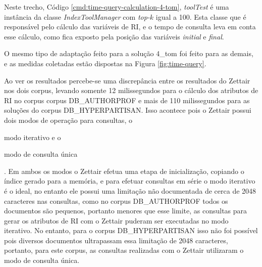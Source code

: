 			\begin{listing}[H]
			\end{listing}
			\vspace{-1.0cm}
			\inputminted[bgcolor=bg, 
			tabsize=4, baselinestretch=1, breaklines]{python}{codes/time-query-calculation-4-tom.py}
			\vspace{-1.0cm}
			\Ididthis

			Neste trecho, Código \ref{cmd:time-query-calculation-4-tom}, \textit{toolTest} é uma instância da classe \textit{IndexToolManager} com \textit{top-$k$} igual a 100. 
			Esta classe que é responsável pelo cálculo das variáveis de RI, e o tempo de consulta leva em conta esse cálculo, como fica exposto pela posição das variáveis \textit{initial} e \textit{final}.

			O mesmo tipo de adaptação feito para a solução 4\_tom foi feito para as demais, e as medidas coletadas estão dispostas na Figura \ref{fig:time-query}.

			


			Ao ver os resultados percebe-se uma discrepância entre os resultados do Zettair nos dois corpus, levando somente 12 milissegundos para o cálculo dos atributos de RI no corpus  corpus DB\_AUTHORPROF e mais de 110 milissegundos para as soluções do corpus DB\_HYPERPARTISAN.
			Isso acontece pois o Zettair possui dois modos de operação para consultas, o 
			\begin{enumerate*}[label=(\alph*)]
				\item modo iterativo e o 
				\item modo de consulta única
			\end{enumerate*}.
			Em ambos os modos o Zettair efetua uma etapa de inicialização, copiando o índice gerado para a memória, e para efetuar consultas em série o modo iterativo é o ideal, no entanto ele possui uma limitação não documentada de cerca de 2048 caracteres nas consultas, como no corpus DB\_AUTHORPROF todos os documentos são pequenos, portanto menores que esse limite, as consultas para gerar os atributos de RI com o Zettair puderam ser executadas no modo iterativo.
			No entanto, para o corpus DB\_HYPERPARTISAN isso não foi possível pois diversos  documentos ultrapassam essa limitação de 2048 caracteres, portanto, para este corpus, as consultas realizadas com o Zettair utilizaram o modo de consulta única.

